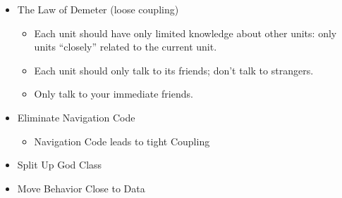 \begin{itemize}
\tightlist
\item
  The Law of Demeter (loose coupling)

  \begin{itemize}
  \tightlist
  \item
    Each unit should have only limited knowledge about other units: only
    units ``closely'' related to the current unit.
  \item
    Each unit should only talk to its friends; don't talk to strangers.
  \item
    Only talk to your immediate friends.
  \end{itemize}
\item
  Eliminate Navigation Code

  \begin{itemize}
  \tightlist
  \item
    Navigation Code leads to tight Coupling
  \end{itemize}
\item
  Split Up God Class
\item
  Move Behavior Close to Data
\end{itemize}

\clearpage